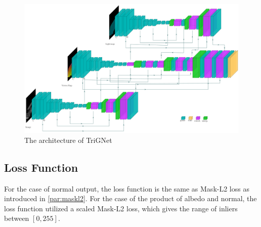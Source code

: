 \documentclass[border=15pt, multi, tikz]{article}
\begin{document}
\begin{figure}
	\centering
	\includegraphics[width=1\textwidth]{Figures/trignet} %
	\caption{The architecture of TriGNet}
	\label{fig:albedo-gated-archi}
\end{figure}


\subsection{Loss Function}
For the case of normal output, the loss function is the same as Mask-L2 loss as introduced in \ref{par:maskl2}. For the case of the product of albedo and normal, the loss function utilized a scaled Mask-L2 loss, which gives the range of inliers between $ [0,255] $. 
\end{document}

